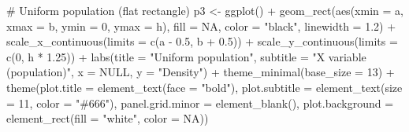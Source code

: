 \documentclass[
  letterpaper,
  DIV=11,
  numbers=noendperiod]{scrreprt}
\newenvironment{Shaded}{\begin{snugshade}}{\end{snugshade}}
\newcommand{\AttributeTok}[1]{\textcolor[rgb]{0.40,0.45,0.13}{#1}}
\newcommand{\CommentTok}[1]{\textcolor[rgb]{0.37,0.37,0.37}{#1}}
\newcommand{\ConstantTok}[1]{\textcolor[rgb]{0.56,0.35,0.01}{#1}}
\newcommand{\DecValTok}[1]{\textcolor[rgb]{0.68,0.00,0.00}{#1}}
\newcommand{\FloatTok}[1]{\textcolor[rgb]{0.68,0.00,0.00}{#1}}
\newcommand{\FunctionTok}[1]{\textcolor[rgb]{0.28,0.35,0.67}{#1}}
\newcommand{\NormalTok}[1]{\textcolor[rgb]{0.00,0.23,0.31}{#1}}
\newcommand{\OtherTok}[1]{\textcolor[rgb]{0.00,0.23,0.31}{#1}}
\newcommand{\SpecialCharTok}[1]{\textcolor[rgb]{0.37,0.37,0.37}{#1}}
\newcommand{\StringTok}[1]{\textcolor[rgb]{0.13,0.47,0.30}{#1}}
\begin{document}
\begin{Shaded}
\begin{Highlighting}[]
\CommentTok{\# Uniform population (flat rectangle)}
\NormalTok{p3 }\OtherTok{\textless{}{-}} \FunctionTok{ggplot}\NormalTok{() }\SpecialCharTok{+}
  \FunctionTok{geom\_rect}\NormalTok{(}\FunctionTok{aes}\NormalTok{(}\AttributeTok{xmin =}\NormalTok{ a, }\AttributeTok{xmax =}\NormalTok{ b, }\AttributeTok{ymin =} \DecValTok{0}\NormalTok{, }\AttributeTok{ymax =}\NormalTok{ h),}
            \AttributeTok{fill =} \ConstantTok{NA}\NormalTok{, }\AttributeTok{color =} \StringTok{"black"}\NormalTok{, }\AttributeTok{linewidth =} \FloatTok{1.2}\NormalTok{) }\SpecialCharTok{+}
  \FunctionTok{scale\_x\_continuous}\NormalTok{(}\AttributeTok{limits =} \FunctionTok{c}\NormalTok{(a }\SpecialCharTok{{-}} \FloatTok{0.5}\NormalTok{, b }\SpecialCharTok{+} \FloatTok{0.5}\NormalTok{)) }\SpecialCharTok{+}
  \FunctionTok{scale\_y\_continuous}\NormalTok{(}\AttributeTok{limits =} \FunctionTok{c}\NormalTok{(}\DecValTok{0}\NormalTok{, h }\SpecialCharTok{*} \FloatTok{1.25}\NormalTok{)) }\SpecialCharTok{+}
  \FunctionTok{labs}\NormalTok{(}\AttributeTok{title =} \StringTok{"Uniform population"}\NormalTok{,}
       \AttributeTok{subtitle =} \StringTok{"X variable (population)"}\NormalTok{,}
       \AttributeTok{x =} \ConstantTok{NULL}\NormalTok{, }\AttributeTok{y =} \StringTok{"Density"}\NormalTok{) }\SpecialCharTok{+}
  \FunctionTok{theme\_minimal}\NormalTok{(}\AttributeTok{base\_size =} \DecValTok{13}\NormalTok{) }\SpecialCharTok{+}
  \FunctionTok{theme}\NormalTok{(}\AttributeTok{plot.title =} \FunctionTok{element\_text}\NormalTok{(}\AttributeTok{face =} \StringTok{"bold"}\NormalTok{),}
        \AttributeTok{plot.subtitle =} \FunctionTok{element\_text}\NormalTok{(}\AttributeTok{size =} \DecValTok{11}\NormalTok{, }\AttributeTok{color =} \StringTok{"\#666"}\NormalTok{),}
        \AttributeTok{panel.grid.minor =} \FunctionTok{element\_blank}\NormalTok{(),}
        \AttributeTok{plot.background =} \FunctionTok{element\_rect}\NormalTok{(}\AttributeTok{fill =} \StringTok{"white"}\NormalTok{, }\AttributeTok{color =} \ConstantTok{NA}\NormalTok{))}


\end{Highlighting}
\end{Shaded}
\end{document}
